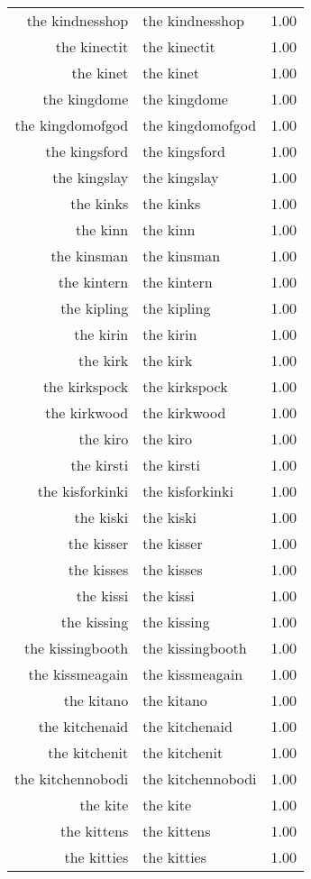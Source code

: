 \begin{table}[ht]
\begin{tabular}{rlr}
  the kindnesshop & the kindnesshop & 1.00 \\ 
  the kinectit & the kinectit & 1.00 \\ 
  the kinet & the kinet & 1.00 \\ 
  the kingdome & the kingdome & 1.00 \\ 
  the kingdomofgod & the kingdomofgod & 1.00 \\ 
  the kingsford & the kingsford & 1.00 \\ 
  the kingslay & the kingslay & 1.00 \\ 
  the kinks & the kinks & 1.00 \\ 
  the kinn & the kinn & 1.00 \\ 
  the kinsman & the kinsman & 1.00 \\ 
  the kintern & the kintern & 1.00 \\ 
  the kipling & the kipling & 1.00 \\ 
  the kirin & the kirin & 1.00 \\ 
  the kirk & the kirk & 1.00 \\ 
  the kirkspock & the kirkspock & 1.00 \\ 
  the kirkwood & the kirkwood & 1.00 \\ 
  the kiro & the kiro & 1.00 \\ 
  the kirsti & the kirsti & 1.00 \\ 
  the kisforkinki & the kisforkinki & 1.00 \\ 
  the kiski & the kiski & 1.00 \\ 
  the kisser & the kisser & 1.00 \\ 
  the kisses & the kisses & 1.00 \\ 
  the kissi & the kissi & 1.00 \\ 
  the kissing & the kissing & 1.00 \\ 
  the kissingbooth & the kissingbooth & 1.00 \\ 
  the kissmeagain & the kissmeagain & 1.00 \\ 
  the kitano & the kitano & 1.00 \\ 
  the kitchenaid & the kitchenaid & 1.00 \\ 
  the kitchenit & the kitchenit & 1.00 \\ 
  the kitchennobodi & the kitchennobodi & 1.00 \\ 
  the kite & the kite & 1.00 \\ 
  the kittens & the kittens & 1.00 \\ 
  the kitties & the kitties & 1.00 \\ 

\end{tabular}
\end{table}
